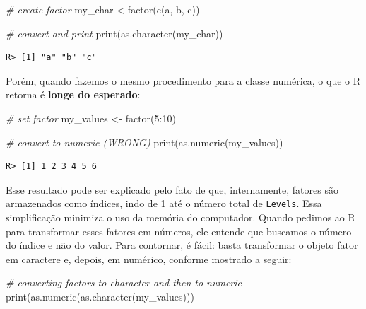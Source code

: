 \documentclass[
  11pt,
]{book}
\newenvironment{Shaded}{\begin{snugshade}}{\end{snugshade}}
\newcommand{\CommentTok}[1]{\textcolor[rgb]{0.37,0.37,0.37}{\textit{#1}}}
\newcommand{\DecValTok}[1]{\textcolor[rgb]{0.06,0.06,0.06}{#1}}
\newcommand{\FunctionTok}[1]{\textcolor[rgb]{0,0,0}{#1}}
\newcommand{\NormalTok}[1]{#1}
\newcommand{\OtherTok}[1]{\textcolor[rgb]{0.37,0.37,0.37}{#1}}
\newcommand{\SpecialCharTok}[1]{\textcolor[rgb]{0,0,0}{#1}}
\newcommand{\StringTok}[1]{\textcolor[rgb]{0.5,0.5,0.5}{#1}}
\begin{document}
\begin{Shaded}
\begin{Highlighting}[]
\CommentTok{\# create factor}
\NormalTok{my\_char }\OtherTok{\textless{}{-}}\FunctionTok{factor}\NormalTok{(}\FunctionTok{c}\NormalTok{(}\StringTok{\textquotesingle{}a\textquotesingle{}}\NormalTok{, }\StringTok{\textquotesingle{}b\textquotesingle{}}\NormalTok{, }\StringTok{\textquotesingle{}c\textquotesingle{}}\NormalTok{))}

\CommentTok{\# convert and print}
\FunctionTok{print}\NormalTok{(}\FunctionTok{as.character}\NormalTok{(my\_char))}
\end{Highlighting}
\end{Shaded}

\begin{verbatim}
R> [1] "a" "b" "c"
\end{verbatim}

Porém, quando fazemos o mesmo procedimento para a classe numérica, o que o R retorna é \textbf{longe do esperado}:

\begin{Shaded}
\begin{Highlighting}[]
\CommentTok{\# set factor}
\NormalTok{my\_values }\OtherTok{\textless{}{-}} \FunctionTok{factor}\NormalTok{(}\DecValTok{5}\SpecialCharTok{:}\DecValTok{10}\NormalTok{)}

\CommentTok{\# convert to numeric (WRONG)}
\FunctionTok{print}\NormalTok{(}\FunctionTok{as.numeric}\NormalTok{(my\_values))}
\end{Highlighting}
\end{Shaded}

\begin{verbatim}
R> [1] 1 2 3 4 5 6
\end{verbatim}

Esse resultado pode ser explicado pelo fato de que, internamente, fatores são armazenados como índices, indo de 1 até o número total de \texttt{Levels}. Essa simplificação minimiza o uso da memória do computador. Quando pedimos ao R para transformar esses fatores em números, ele entende que buscamos o número do índice e não do valor. Para contornar, é fácil: basta transformar o objeto fator em caractere e, depois, em numérico, conforme mostrado a seguir:

\begin{Shaded}
\begin{Highlighting}[]
\CommentTok{\# converting factors to character and then to numeric}
\FunctionTok{print}\NormalTok{(}\FunctionTok{as.numeric}\NormalTok{(}\FunctionTok{as.character}\NormalTok{(my\_values)))}
\end{Highlighting}
\end{Shaded}
\end{document}
